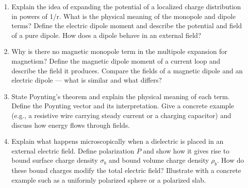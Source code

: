 \documentclass[11pt]{article}
\begin{document}
\begin{enumerate}
\item Explain the idea of expanding the potential of a localized charge distribution in powers of 1/r. What is the physical meaning of the monopole and dipole terms? Define the electric dipole moment and describe the potential and field of a pure dipole. How does a dipole behave in an external field?
\item Why is there no magnetic monopole term in the multipole expansion for magnetism? Define the magnetic dipole moment of a current loop and describe the field it produces. Compare the fields of a magnetic dipole and an electric dipole — what is similar and what differs?
\item State Poynting's theorem and explain the physical meaning of each term. Define the Poynting vector and its interpretation. Give a concrete example (e.g., a resistive wire carrying steady current or a charging capacitor) and discuss how energy flows through fields.
\item Explain what happens microscopically when a dielectric is placed in an external electric field. Define polarization $P$ and show how it gives rise to bound surface charge density $\sigma_b$ and bound volume charge density $\rho_b$. How do these bound charges modify the total electric field? Illustrate with a concrete example such as a uniformly polarized sphere or a polarized slab.

\end{enumerate}
\end{document}
